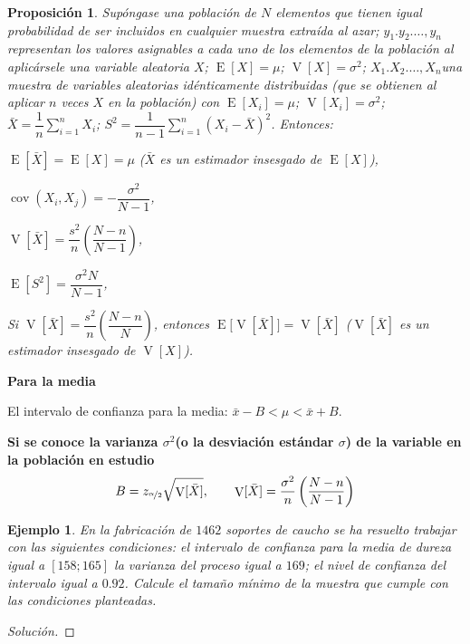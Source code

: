 \documentclass[a5paper,doc,10pt,noapacite]{apa6}
\DeclareMathOperator{\Esp}{E}
\DeclareMathOperator{\Var}{V}
\DeclareMathOperator{\cov}{cov}
\newtheorem{proposicion}{Proposición}
\newtheorem{ejem}{Ejemplo}
\newcommand{\neodefi}[1]{%
	\vspace{1\baselineskip}
	\textbf{\small#1} \newline
}
\begin{document}
{{\begin{proposicion}
	Supóngase una población de \(N\) elementos que tienen igual probabilidad de ser incluidos en cualquier muestra extraída al azar; \(y_1.y_2.\ldots,y_n\) representan los valores asignables a cada uno de los elementos de la población al aplicársele una variable aleatoria \(X\); \(\Esp[X]=\mu\); \(\Var[X]=\sigma^2\); \(X_1.X_2.\ldots,X_n\)una muestra de variables aleatorias idénticamente distribuidas (que se obtienen al aplicar \(n\) veces \(X\) en la población) con \(\Esp[X_i]=\mu\); \(\Var[X_i]=\sigma^2\); \(\bar{X}=\dfrac{1}{n}\displaystyle\sum_{i=1}^{n}X_i\); \(S^2=\dfrac{1}{n-1}\displaystyle\sum_{i=1}^{n}(X_i-\bar{X})^2\). Entonces:
	\begin{APAenumerate}
		\item \(\Esp[\bar{X}]=\Esp[X]=\mu\) (\(\bar{X}\) es un estimador insesgado de \(\Esp[X]\)),
		\item \(\cov(X_i,X_j)=-\dfrac{\sigma^2}{N-1}\),
		\item \(\Var[\bar{X}]=\dfrac{s^2}{n}\left(\dfrac{N-n}{N-1}\right)\),
		\item \(\Esp[S^2]=\dfrac{\sigma^2N}{N-1}\),
		\item Si \(\Var[\bar{X}]=\dfrac{s^2}{n}\left(\dfrac{N-n}{N}\right)\), entonces  \(\Esp\big[\Var[\bar{X}]\big]=\Var[\bar{X}]\)
		(\(\Var[\bar{X}]\) es un estimador insesgado de \(\Var[X]\)).
	\end{APAenumerate}
\end{proposicion}


\neodefi{Para la media} 

El intervalo de confianza para la media: \(\bar{x}-B<\mu<\bar{x}+B\).

\vspace{0.75\baselineskip}
	\textbf{Si se conoce la varianza \(\sigma^2\)(o la desviación estándar \(\sigma\)) de la variable en la población en estudio}
	\[
		B=z_{\nicefrac{\alpha}{2}}\sqrt{\Var[\bar{X}]}, \qquad \Var[\bar{X}]=\dfrac{\sigma^2}{n}\left(\dfrac{N-n}{N-1}\right)
	\]
	

\begin{ejem}
	En la fabricación de \(1462\) soportes de caucho se ha resuelto trabajar con las siguientes condiciones: el intervalo de confianza para la media de dureza igual a \([158 ; 165] \) la varianza del proceso igual a \(169\); el nivel de confianza del intervalo igual a \(0.92\). Calcule el tamaño mínimo de la muestra que cumple con las condiciones planteadas.
\end{ejem}
\begin{proof}[Solución]\qquad


\end{proof}}}
\end{document}
